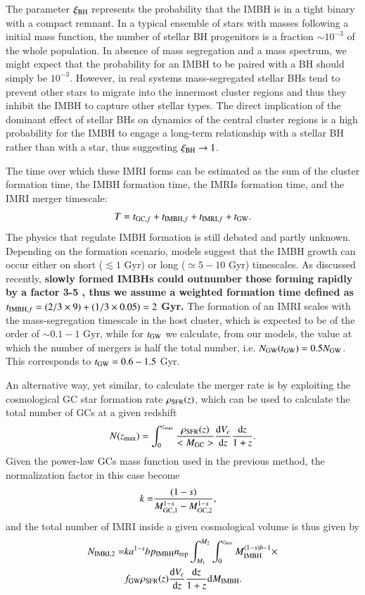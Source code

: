 \documentclass[article]{aa}
\newcommand{\derd}{{\rm d}}
\newcommand{\gw}{{\rm GW}}
\newcommand{\gc}{{\rm GC}}
\newcommand{\ibh}{{\rm IMBH}}
\newcommand{\imri}{{\rm IMRI}}
\newcommand{\bh}{{\rm BH}}
\begin{document}
The parameter $\xi_\bh$ represents the probability that the IMBH is in a tight binary with a compact remnant. In a typical ensemble of stars with masses following a \cite{kroupa01} initial mass function, the number of stellar BH progenitors is a fraction $\sim 10^{-3}$ of the whole population. In absence of mass segregation and a mass spectrum, we might expect that the probability for an IMBH to be paired with a BH should simply be $10^{-3}$. However, in real systems mass-segregated stellar BHs tend to prevent other stars to migrate into the innermost cluster regions and thus they inhibit the IMBH to capture other stellar types. The direct implication of the dominant effect of stellar BHs on dynamics of the central cluster regions is a high probability for the IMBH to engage a long-term relationship with a stellar BH rather than with a star, thus suggesting $\xi_\bh \rightarrow 1$.


The time over which these IMRI forms can be estimated as the sum of the cluster formation time, the IMBH formation time, the IMRIs formation time, and the IMRI merger timescale:
\begin{equation}
T = t_{\gc ,f} + t_{\ibh ,f} + t_{\imri, f} + t_{\rm GW}. 
\end{equation}
The physics that regulate IMBH formation is still debated and partly unknown. Depending on the formation scenario, models suggest that the IMBH growth can occur either on short ($\lesssim 1$ Gyr) or long ($\simeq 5-10$ Gyr) timescales. As discussed recently, {\bf slowly formed IMBHs could outnumber those forming rapidly by a factor 3-5 \citep{giersz15,AAG19}, thus we assume a weighted formation time defined as $t_{\ibh ,f} = (2/3\times 9) + (1/3\times 0.05) = 2$ Gyr. } The formation of an IMRI scales with the mass-segregation timescale in the host cluster, which is expected to be of the order of $\sim 0.1-1$ Gyr, while for $t_\gw$ we calculate, from our models, the value at which the number of mergers is half the total number, i.e. $N_\gw(t_\gw) = 0.5 N_\gw$. This corresponds to $t_\gw = 0.6-1.5$ Gyr. 

An alternative way, yet similar, to calculate the merger rate is by exploiting the cosmological GC star formation rate $\rho_{\rm SFR}(z)$, which can be used to calculate the total number of GCs at a given redshift
\begin{equation}
N(z_{\rm max}) =  \int_0^{z_{\rm max}} \frac{\rho_{\rm SFR}(z)}{<M_\gc>}\frac{\derd V_c}{\derd z}\frac{\derd z}{1+z}.
\end{equation} 
Given the power-law GCs mass function used in the previous method, the normalization factor in this case become
\begin{align}
k  =&\frac{(1-s)}{M_{\gc, 1}^{1-s} - M_{\gc ,2}^{1-s}},
\end{align}
and the total number of IMRI inside a given cosmological volume is thus given by
\begin{align}
N_{\imri, 2} = & k a^{1-s} b p_\ibh n_{\rm rep} \int_{M_{1}}^{M_{2}} \int_0^{z_{hor}} M_\ibh^{(1-s)b-1} \times \nonumber \\
& f_{\gw}  \rho_{\rm SFR}(z)\frac{\derd V_c}{\derd z} \frac{\derd z}{1+z} \derd M_\ibh.
\label{eq:nimri2}
\end{align}
\end{document}
